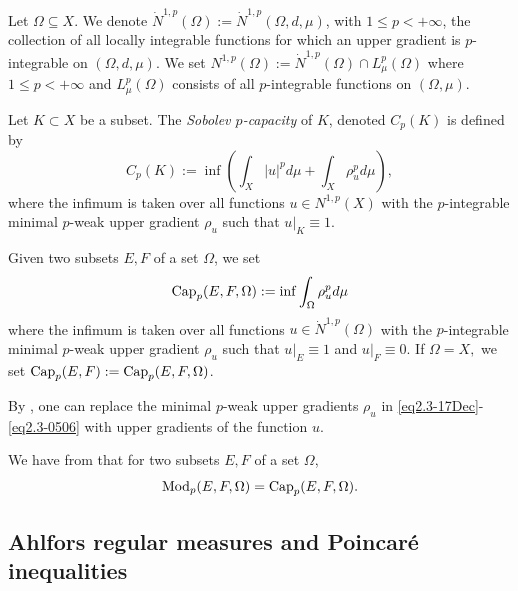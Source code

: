 \documentclass[10pt]{amsart}
\numberwithin{equation}{section}
\begin{document}
Let $\Omega\subseteq X$. We denote $\dot N^{1,p}(\Omega):=\dot N^{1,p}(\Omega,d,\mu)$, with $1\leq p<+\infty$, the collection of all locally integrable functions for which an upper gradient is $p$-integrable on $(\Omega,d,\mu)$. We set $N^{1,p}(\Omega):=\dot N^{1,p}(\Omega)\cap L^p_\mu(\Omega)$ where $1\leq p<+\infty$ and $L^p_\mu(\Omega)$ consists of all $p$-integrable functions on $(\Omega,\mu)$.

Let $K\subset X$ be a subset. The \emph{Sobolev $p$-capacity} of $K$, denoted $C_p(K)$ is defined by 
\begin{equation}\label{eq2.3-17Dec}
C_p(K):=\inf\left(\int_X |u|^pd\mu+\int_X\rho_u^pd\mu\right),
\end{equation}
where the infimum is taken over all functions $u\in N^{1,p}(X)$ with the $p$-integrable minimal $p$-weak upper gradient $\rho_u$ such that $u|_K\equiv 1$.

Given two subsets $E,F$ of a set $\Omega$, we set 
\begin{equation}\label{eq2.3-0506}
	\text{\rm Cap}_p(E,F,\Omega):=\inf\int_\Omega \rho_u^pd\mu
\end{equation}
where the infimum is taken over all functions $u\in\dot N^{1,p}(\Omega)$ with the $p$-integrable minimal $p$-weak upper gradient $\rho_u$ such that $u|_E\equiv 1$ and $u|_{F}\equiv 0$. If $\Omega=X,$ we set $\text{\rm Cap}_p(E,F):=\text{\rm Cap}_p(E,F,\Omega)$.  

{By \cite[Lemma 6.2.2]{pekka}, one can replace the minimal $p$-weak upper gradients $\rho_u$ in \eqref{eq2.3-17Dec}-\eqref{eq2.3-0506} with upper gradients of the function $u$.}   


We have from \cite[Proposition 2.17]{HK98} that for two subsets $E,F$ of a set $\Omega$,
\begin{equation}\label{eq2.4-2308}
\text{\rm Mod}_p(E,F,\Omega)=\text{\rm Cap}_p(E,F,\Omega).
\end{equation}
\subsection{Ahlfors regular measures  and Poincar\'e inequalities}\label{admissible} \ 
\end{document}
